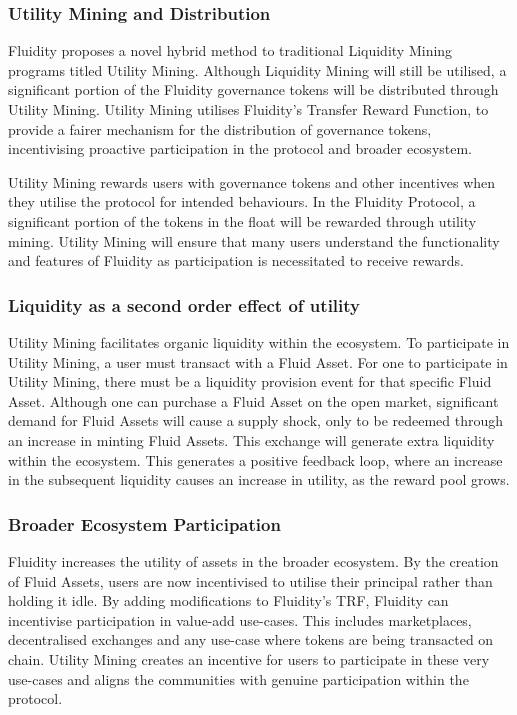 \subsubsection{Utility Mining and Distribution}

Fluidity proposes a novel hybrid method to traditional Liquidity Mining programs titled Utility Mining. Although Liquidity Mining will still be utilised, a significant portion of the Fluidity governance tokens will be distributed through Utility Mining. Utility Mining utilises Fluidity's Transfer Reward Function, to provide a fairer mechanism for the distribution of governance tokens, incentivising proactive participation in the protocol and broader ecosystem. 

Utility Mining rewards users with governance tokens and other incentives when they utilise the protocol for intended behaviours. In the Fluidity Protocol, a significant portion of the tokens in the float will be rewarded through utility mining. Utility Mining will ensure that many users understand the functionality and features of Fluidity as participation is necessitated to receive rewards.

\subsubsection{Liquidity as a second order effect of utility}

Utility Mining facilitates organic liquidity within the ecosystem. To participate in Utility Mining, a user must transact with a Fluid Asset. For one to participate in Utility Mining, there must be a liquidity provision event for that specific Fluid Asset. Although one can purchase a Fluid Asset on the open market, significant demand for Fluid Assets will cause a supply shock, only to be redeemed through an increase in minting Fluid Assets. This exchange will generate extra liquidity within the ecosystem. This generates a positive feedback loop, where an increase in the subsequent liquidity causes an increase in utility, as the reward pool grows.

\subsubsection{Broader Ecosystem Participation}
Fluidity increases the utility of assets in the broader ecosystem. By the creation of Fluid Assets, users are now incentivised to utilise their principal rather than holding it idle. By adding modifications to Fluidity's TRF, Fluidity can incentivise participation in value-add use-cases. This includes marketplaces, decentralised exchanges and any use-case where tokens are being transacted on chain. Utility Mining creates an incentive for users to participate in these very use-cases and aligns the communities with genuine participation within the protocol.

